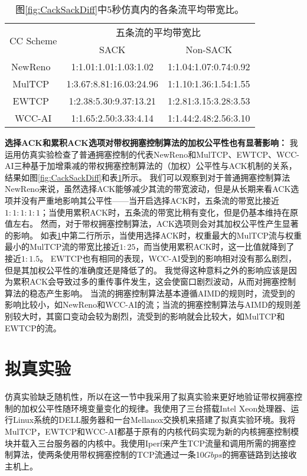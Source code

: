 \documentclass[winfonts]{njuthesis}
\begin{document}
\begin{table}[h]
	\caption{图\ref{fig:CackSackDiff}中5秒仿真内的各条流平均带宽比。}
	\label{tab:CackSackDiff}
	\centering
	\begin{tabular}{c|cc}
		\hline
		\multirow{2}{*}{CC Scheme} & \multicolumn{2}{c}{五条流的平均带宽比} \\
		\cline{2-3} & SACK & Non-SACK \\
		\hline
		NewReno~\cite{Henderson2012NewReno} & 1:1.01:1.01:1.03:1.02 & 1:1.04:1.07:0.74:0.92 \\
		MulTCP~\cite{crowcroft1998differentiated} & 1:3.67:8.81:16.03:24.96 & 1:1.10:1.36:1.54:1.55 \\
		EWTCP~\cite{Honda2009EWTCP} & 1:2.38:5.30:9.37:13.21 & 1:2.81:3.15:3.28:3.53\\
		WCC-AI & 1:1.65:2.50:3.33:4.14 & 1:1.44:2.48:2.56:3.10\\
		\hline
	\end{tabular}
\end{table}

\textbf{选择ACK和累积ACK选项对带权拥塞控制算法的加权公平性也有显著影响：}
我运用仿真实验检查了普通拥塞控制的代表NewReno和MulTCP、EWTCP、WCC-AI三种基于加增乘减的带权拥塞控制算法的（加权）公平性与ACK机制的关系，结果如图\ref{fig:CackSackDiff}和表\ref{tab:CackSackDiff}所示。
我们可以观察到对于普通拥塞控制算法NewReno来说，虽然选择ACK能够减少其流的带宽波动，但是从长期来看ACK选项并没有严重地影响其公平性——当开启选择ACK时，五条流的带宽比接近$1:1:1:1:1$；当使用累积ACK时，五条流的带宽比稍有变化，但是仍基本维持在原值左右。
然而，对于带权拥塞控制算法，ACK选项则会对其加权公平性产生显著的影响。
如表\ref{tab:CackSackDiff}中第二行所示，当使用选择ACK时，权重最大的MulTCP流与权重最小的MulTCP流的带宽比接近$1:25$，而当使用累积ACK时，这一比值就降到了接近$1:1.5$。
EWTCP也有相同的表现，WCC-AI受到的影响相对没有那么剧烈，但是其加权公平性的准确度还是降低了的。
我觉得这种意料之外的影响应该是因为累积ACK会导致过多的重传事件发生\cite{Mathis1996SACK}，这会使窗口剧烈波动，从而对拥塞控制算法的稳态产生影响。
当流的拥塞控制算法基本遵循AIMD的规则时，流受到的影响比较小，如NewReno和WCC-AI的流；当流的拥塞控制算法与AIMD的规则差别较大时，其窗口变动会较为剧烈，流受到的影响就会比较大，如MulTCP和EWTCP的流。

\section{拟真实验}
\label{sec:emulation}

仿真实验缺乏随机性，所以在这一节中我采用了拟真实验来更好地验证带权拥塞控制的加权公平性随环境变量变化的规律。我使用了三台搭载Intel Xeon处理器、运行Linux系统的DELL服务器和一台Mellanox交换机来搭建了拟真实验环境。我将MulTCP，EWTCP和WCC-AI都基于原有的内核代码实现为新的内核拥塞控制模块并载入三台服务器的内核中。我使用Iperf\cite{iperf}来产生TCP流量和调用所需的拥塞控制算法，使两条使用带权拥塞控制的TCP流通过一条10$Gbps$的拥塞链路到达接收主机上。
\end{document}
